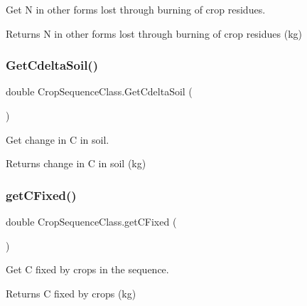 Get N in other forms lost through burning of crop residues. 

\begin{DoxyReturn}{Returns}
N in other forms lost through burning of crop residues (kg) 
\end{DoxyReturn}
\mbox{\label{class_crop_sequence_class_aad00e0d95ab118f4bacec6a9fba51230}} 
\subsubsection{\texorpdfstring{GetCdeltaSoil()}{GetCdeltaSoil()}}
{\footnotesize\ttfamily double Crop\+Sequence\+Class.\+Get\+Cdelta\+Soil (\begin{DoxyParamCaption}{ }\end{DoxyParamCaption})\hspace{0.3cm}{\ttfamily [inline]}}



Get change in C in soil. 

\begin{DoxyReturn}{Returns}
change in C in soil (kg) 
\end{DoxyReturn}
\mbox{\label{class_crop_sequence_class_a166831b02adbb3428ef7989c4dde6d4b}} 
\subsubsection{\texorpdfstring{getCFixed()}{getCFixed()}}
{\footnotesize\ttfamily double Crop\+Sequence\+Class.\+get\+C\+Fixed (\begin{DoxyParamCaption}{ }\end{DoxyParamCaption})\hspace{0.3cm}{\ttfamily [inline]}}



Get C fixed by crops in the sequence. 

\begin{DoxyReturn}{Returns}
C fixed by crops (kg) 
\end{DoxyReturn}
\mbox{\label{class_crop_sequence_class_a9bc2f3e9444586ed86c4603aa91fb9b6}} 
